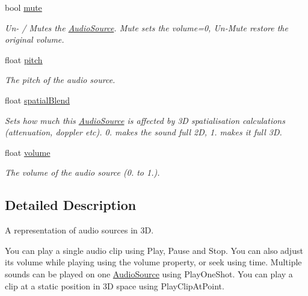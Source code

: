 \begin{DoxyCompactItemize}
bool \mbox{\hyperlink{class_lua_1_1_audio_source_ad82dcfe66567f1dac8a15edc327c89ff}{mute}}
\begin{DoxyCompactList}\small\item\em Un-\/ / Mutes the \mbox{\hyperlink{class_lua_1_1_audio_source}{Audio\+Source}}. Mute sets the volume=0, Un-\/\+Mute restore the original volume. \end{DoxyCompactList}\item 
float \mbox{\hyperlink{class_lua_1_1_audio_source_a49d0053bb3cfa0b42c70f3b678e0d78f}{pitch}}
\begin{DoxyCompactList}\small\item\em The pitch of the audio source. \end{DoxyCompactList}\item 
float \mbox{\hyperlink{class_lua_1_1_audio_source_a88e74fc4c2c4cf17747d6bbdad516a8f}{spatial\+Blend}}
\begin{DoxyCompactList}\small\item\em Sets how much this \mbox{\hyperlink{class_lua_1_1_audio_source}{Audio\+Source}} is affected by 3D spatialisation calculations (attenuation, doppler etc). 0. makes the sound full 2D, 1. makes it full 3D. \end{DoxyCompactList}\item 
float \mbox{\hyperlink{class_lua_1_1_audio_source_a6e631df6c296491e5a29c8025878ddb4}{volume}}
\begin{DoxyCompactList}\small\item\em The volume of the audio source (0. to 1.). \end{DoxyCompactList}\end{DoxyCompactItemize}


\subsection{Detailed Description}
A representation of audio sources in 3D. 

You can play a single audio clip using Play, Pause and Stop. You can also adjust its volume while playing using the volume property, or seek using time. Multiple sounds can be played on one \mbox{\hyperlink{class_lua_1_1_audio_source}{Audio\+Source}} using Play\+One\+Shot. You can play a clip at a static position in 3D space using Play\+Clip\+At\+Point. 

